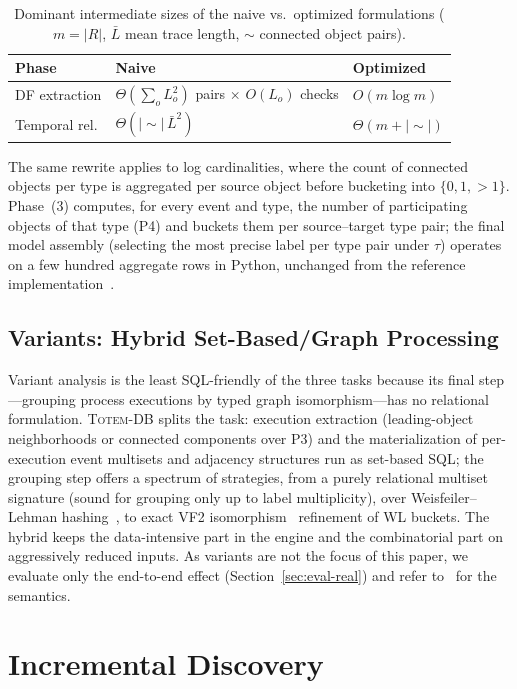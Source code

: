 \documentclass[sigconf, nonacm]{acmart}
\newcommand{\sys}{\textsc{Totem-DB}\xspace}
\begin{document}
\begin{table}
\caption{Dominant intermediate sizes of the naive vs.\ optimized formulations ($m=|R|$, $\bar{L}$ mean trace length, $\sim$ connected object pairs).}
\label{tab:complexity}
\small
\begin{tabular}{lll}
\toprule
Phase & Naive & Optimized \\
\midrule
DF extraction & $\Theta(\sum_o L_o^2)$ pairs $\times$ $O(L_o)$ checks & $O(m \log m)$ \\
Temporal rel. & $\Theta(|{\sim}|\,\bar{L}^2)$ & $\Theta(m + |{\sim}|)$ \\
\bottomrule
\end{tabular}
\end{table} The same rewrite applies to log cardinalities, where the count of connected objects per type is aggregated per source object before bucketing into $\{0, 1, >1\}$. Phase~(3) computes, for every event and type, the number of participating objects of that type (P4) and buckets them per source--target type pair; the final model assembly (selecting the most precise label per type pair under $\tau$) operates on a few hundred aggregate rows in Python, unchanged from the reference implementation~\cite{liss2024totem}.

\subsection{Variants: Hybrid Set-Based/Graph Processing}
\label{sec:variants-sql}

Variant analysis is the least SQL-friendly of the three tasks because its final step---grouping process executions by typed graph isomorphism---has no relational formulation. \sys splits the task: execution extraction (leading-object neighborhoods or connected components over P3) and the materialization of per-execution event multisets and adjacency structures run as set-based SQL; the grouping step offers a spectrum of strategies, from a purely relational multiset signature (sound for grouping only up to label multiplicity), over Weisfeiler--Lehman hashing~\cite{wl2011}, to exact VF2 isomorphism~\cite{vf2} refinement of WL buckets. The hybrid keeps the data-intensive part in the engine and the combinatorial part on aggressively reduced inputs. As variants are not the focus of this paper, we evaluate only the end-to-end effect (Section~\ref{sec:eval-real}) and refer to~\cite{adams2022variants} for the semantics.

\section{Incremental Discovery}
\label{sec:incremental}
\end{document}
